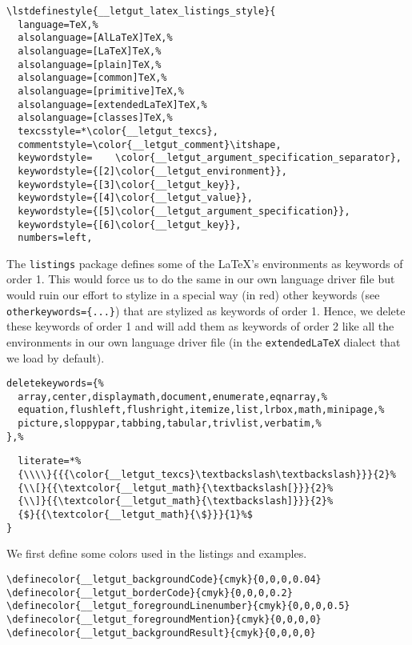 \documentclass{letgut}
\begin{document}
\begin{lstlisting}
\lstdefinestyle{__letgut_latex_listings_style}{
  language=TeX,%
  alsolanguage=[AlLaTeX]TeX,%
  alsolanguage=[LaTeX]TeX,%
  alsolanguage=[plain]TeX,%
  alsolanguage=[common]TeX,%
  alsolanguage=[primitive]TeX,%
  alsolanguage=[extendedLaTeX]TeX,%
  alsolanguage=[classes]TeX,%
  texcsstyle=*\color{__letgut_texcs},
  commentstyle=\color{__letgut_comment}\itshape,
  keywordstyle=    \color{__letgut_argument_specification_separator},
  keywordstyle={[2]\color{__letgut_environment}},
  keywordstyle={[3]\color{__letgut_key}},
  keywordstyle={[4]\color{__letgut_value}},
  keywordstyle={[5]\color{__letgut_argument_specification}},
  keywordstyle={[6]\color{__letgut_key}},
  numbers=left,
\end{lstlisting}

The \lstinline+listings+ package defines some of the LaTeX's environments as keywords of
order 1. This would force us to do the same in our own language driver file but
would ruin our effort to stylize in a special way (in red) other keywords (see
\lstinline+otherkeywords={...}+) that are stylized as keywords of order 1. Hence, we
delete these keywords of order 1 and will add them as keywords of order 2 like
all the environments in our own language driver file (in the \lstinline+extendedLaTeX+ dialect
that we load by default).

\begin{lstlisting}
deletekeywords={%
  array,center,displaymath,document,enumerate,eqnarray,%
  equation,flushleft,flushright,itemize,list,lrbox,math,minipage,%
  picture,sloppypar,tabbing,tabular,trivlist,verbatim,%
},%
\end{lstlisting}

\begin{lstlisting}
  literate=*%
  {\\\\}{{{\color{__letgut_texcs}\textbackslash\textbackslash}}}{2}%
  {\\[}{{\textcolor{__letgut_math}{\textbackslash[}}}{2}%
  {\\]}{{\textcolor{__letgut_math}{\textbackslash]}}}{2}%
  {$}{{\textcolor{__letgut_math}{\$}}}{1}%$
}
\end{lstlisting}

We first define some colors used in the listings and examples.

\begin{lstlisting}
\definecolor{__letgut_backgroundCode}{cmyk}{0,0,0,0.04}
\definecolor{__letgut_borderCode}{cmyk}{0,0,0,0.2}
\definecolor{__letgut_foregroundLinenumber}{cmyk}{0,0,0,0.5}
\definecolor{__letgut_foregroundMention}{cmyk}{0,0,0,0}
\definecolor{__letgut_backgroundResult}{cmyk}{0,0,0,0}
\end{lstlisting}
\end{document}
